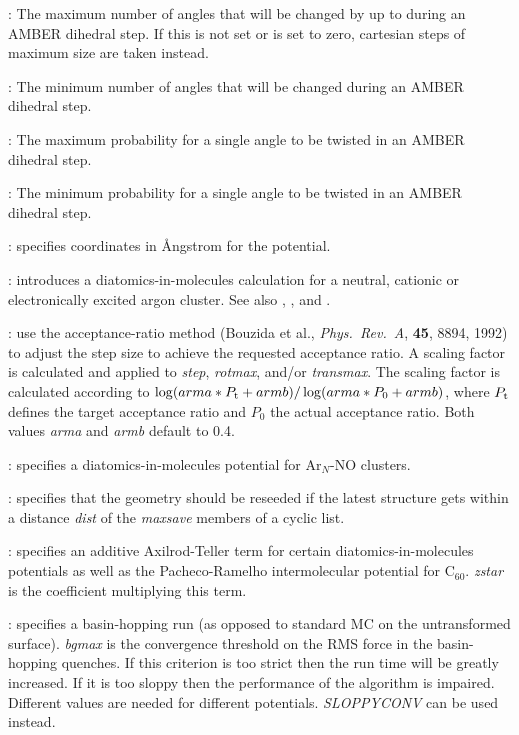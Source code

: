 : The maximum number of angles that will be changed by up to {\/} during an 
AMBER dihedral step. If this is not set or is set to zero, cartesian steps of maximum size {\/} are taken 
instead. 

: The minimum number of angles that will be changed during an AMBER dihedral step.

: The maximum probability for a single angle to be twisted in an AMBER dihedral step.

: The minimum probability for a single angle to be twisted in an AMBER dihedral step.

: specifies coordinates in \AA ngstrom for the {\/}
potential.

: introduces a diatomics-in-molecules calculation for
a neutral, cationic or electronically excited argon cluster. See also
{\/}, {\/}, {\/} and {\/}.

: use the acceptance-ratio method (Bouzida et al., {\it Phys.~Rev.~A},
{\bf 45}, 8894, 1992)  to adjust the step size to achieve the requested 
acceptance ratio. A scaling factor is calculated and applied to {\it step}, {\it rotmax},
and/or {\it transmax}. The scaling factor is calculated according to 
$\log(arma*P_{\rm t}+armb)/\log(arma*P_0+armb)$, where $P_{\rm t}$ defines the
target acceptance ratio and $P_0$ the actual acceptance ratio. Both values {\it arma} and
{\it armb} default to 0.4.

: specifies a diatomics-in-molecules potential for Ar$_N$-NO clusters.

: specifies that the geometry should be reseeded if the
latest structure gets within a distance {\it dist} of the {\it maxsave} members of a
cyclic list.

: specifies an additive Axilrod-Teller term for certain
diatomics-in-molecules potentials as well as the Pacheco-Ramelho intermolecular potential for
C$_{60}$.\cite{pachecor97} 
{\it zstar\/} is the coefficient multiplying this term.

: specifies a basin-hopping run (as opposed to standard MC
on the untransformed surface). {\it bgmax\/} is the convergence threshold
on the RMS force in the basin-hopping
quenches. If this criterion is too strict then the run time will be greatly increased.
If it is too sloppy then the performance of the algorithm is impaired. Different values
are needed for different potentials. {\it SLOPPYCONV} can be used instead.

